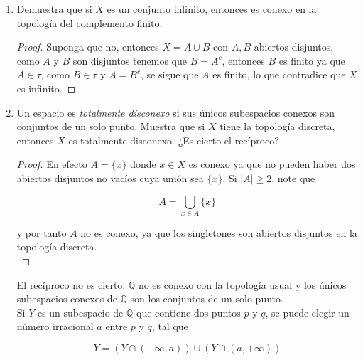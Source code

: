 \documentclass[11pt]{article}
\begin{document}
\begin{enumerate}
    \begin{proof}
        Note que $$A\cup \bigcup_{\alpha}A_{\alpha}=\bigcup_{\alpha}(A\cup A_{\alpha})$$

        y como $A\subset \displaystyle \bigcap_{\alpha}(A\cup A_{\alpha}) 
            $, y $A\neq \emptyset$, El conjunto $\{A \cup A_{\alpha}\}_{\alpha}$ es una colección de subespacios conexos de X con un punto en común, de donde se conluye lo deseado.
    \end{proof}
    
    \item Demuestra que si $X$ es un conjunto infinito, entonces es conexo en la topología del complemento finito.

    \begin{proof}
        Suponga que no, entonces $X=A\cup B$ con $A,B$ abiertos disjuntos, como $A$ y $B$ son disjuntos tenemos que $B=A^{c}$, entonces $B$ es finito ya que $A\in \tau$, como $B\in \tau$ y $A=B^{c}$, se sigue que $A$ es finito, lo que contradice que $X$ es infinito.
    \end{proof}
    
    \item Un espacio es \textit{totalmente disconexo} si sus únicos subespacios conexos son conjuntos de un solo punto. Muestra que si $X$ tiene la topología discreta, entonces $X$ es totalmente disconexo. ¿Es cierto el recíproco?

    \begin{proof}
        En efecto $A=\{x\}$ donde ${x\in X}$ es conexo ya que no pueden haber dos abiertos disjuntos no vacíos cuya unión sea $\{x\}$. Si $|A|\geq 2$, note que 

        $$A=\bigcup_{x\in A}\{x\}
            $$

        y por tanto $A$ no es conexo, ya que los singletones son abiertos disjuntos en la topología discreta.\\
    \end{proof}
    
    El recíproco no es cierto. $\mathbb{Q}$ no es conexo con la topología usual y los únicos subespacios conexos de $\mathbb{Q}$ son los conjuntos de un solo punto.\\

    Si $Y$ es un subespacio de $\mathbb{Q}$ que contiene dos puntos $p$ y $q$, se puede elegir un número irracional $a$ entre $p$ y $q$, tal que

$$
Y=(Y \cap (-\infty, a)) \cup  (Y \cap (a, +\infty))
$$


\end{enumerate}
\end{document}
